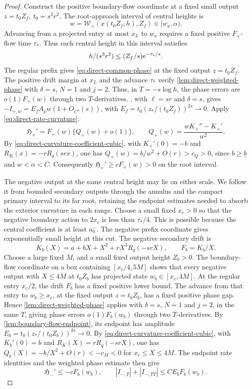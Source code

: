 \begin{proof}
Construct the positive boundary-flow coordinate at a
fixed small output \(z=t_0Z_f,\ t_0=s^2r^2\).
The root-approach interval of central heights is
\begin{equation}
\label{eq:direct-negative-separated-root-cell}
 w=\mathcal W_+(x(t_0Z_f;h),Z_f)\in[w_a,\alpha).
\end{equation}
Advancing from a projected entry at most \(x_L\) to \(w_a\)
requires a fixed positive \(F_+\)-flow time \(\tau_*\).
Thus each central height in this interval satisfies
\[
 h/(s^3r^2)\le (Z_f/s)\mathrm e^{-\tau_*/s}.
\]
The regular prefix gives \eqref{eq:direct-common-phase} at the
fixed output \(z=t_0Z_f\). The positive drift margin at \(x_L\)
and the advance \(\tau_*\) verify
\cref{lem:direct-weighted-phase} with \(\delta=s\), \(N=1\) and
\(j=2\). Thus, in \(T=-s\log h\), the phase errors are
\(o(1)F_+(w)\) through two \(T\)-derivatives.
, with \(\ell=sr\) and
\(\delta=s\), gives \(-I_{+,w}=E_fA_pw(1+O_{C^3}(s))\), with
\(E_f=t_0(z_*/(t_0Z_f))^{2s}\to0\).
Apply \eqref{eq:direct-rate-curvature}:
\[
 \mathfrak H_+'=
 F_+(w)\{Q_+(w)+o(1)\},\qquad
 Q_+(w)=\frac{wK_+''-K_+'}{w^2}.
\]
By \eqref{eq:direct-curvature-coefficient-cubic}, with \(K_+'(0)=-b\) and
\(R_K(x)=-rR_q(srx)\), one has \(Q_+(w)=b/w^2+O(r)>c_Q>0\), since
\(b\ge \underline b\) and \(w<\alpha<C\).
Consequently \(\mathfrak H_+'\ge cF_+(w)>0\) on the root interval.

The negative output at the same central height may lie on either
scale. We follow it from bounded secondary outputs through the annulus
and the compact primary interval to its far root, retaining the
endpoint estimates needed to absorb the exterior curvature in each
range.
Choose a small fixed \(x_c>0\) so that the negative boundary action
to \(2x_c\) is less than \(\tau_*/4\). This is possible
because the central coefficient is at least \(a_0^-\).
The negative prefix coordinate gives exponentially small height
at this cut.
The negative secondary drift is
\[
 K_b(X)=a+bX+X^2+rX^3R_q(-srX),\qquad F_b=K_b/X .
\]
Choose a large fixed \(M\), and a small fixed output
height \(Z_b>0\). The boundary-flow coordinate on
a box containing \([x_c/4,5M]\) shows that every
negative output with \(X\le4M\) at \(t_0Z_b\)
has projected state \(w_b\in[x_c,4M]\).
At the regular entry \(x_c/2\), the drift \(F_b\) has a fixed
positive lower bound. The advance from that entry to
\(w_b\ge x_c\), at the fixed output \(z=t_0Z_b\), has a fixed
positive phase gap. Hence \cref{lem:direct-weighted-phase}
applies with \(\delta=s\), \(N=1\) and \(j=2\), in the same
\(T\), giving phase errors \(o(1)F_b(w_b)\) through two
\(T\)-derivatives.
By \cref{lem:boundary-flow-endpoint}, its endpoint has amplitude
\(E_b=t_0(z_*/(t_0Z_b))^{2s}\to0\). By
\eqref{eq:direct-curvature-coefficient-cubic}, with \(K_b'(0)=b\) and
\(R_K(X)=rR_q(-srX)\), one has \(Q_b(X)=-b/X^2+O(r)<-c_M<0\) for
\(x_c\le X\le4M\). The endpoint rate identities and the weighted phase
estimate then give
\[
 \mathfrak H_-'\le-cF_b(w_b),\qquad
 |I_{-,T}|+|I_{-,TT}|\le CE_bF_b(w_b).
\]


\end{proof}
